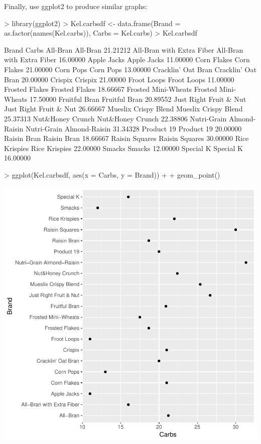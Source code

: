 Finally, use ggplot2 to produce similar graphs:

\begin{Schunk}
\begin{Sinput}
> library(ggplot2)
> Kel.carbsdf <- data.frame(Brand = as.factor(names(Kel.carbs)), Carbs = Kel.carbs)
> Kel.carbsdf 
\end{Sinput}
\begin{Soutput}
                                              Brand    Carbs
All-Bran                                   All-Bran 21.21212
All-Bran with Extra Fiber All-Bran with Extra Fiber 16.00000
Apple Jacks                             Apple Jacks 11.00000
Corn Flakes                             Corn Flakes 21.00000
Corn Pops                                 Corn Pops 13.00000
Cracklin' Oat Bran               Cracklin' Oat Bran 20.00000
Crispix                                     Crispix 21.00000
Froot Loops                             Froot Loops 11.00000
Frosted Flakes                       Frosted Flakes 18.66667
Frosted Mini-Wheats             Frosted Mini-Wheats 17.50000
Fruitful Bran                         Fruitful Bran 20.89552
Just Right Fruit & Nut       Just Right Fruit & Nut 26.66667
Mueslix Crispy Blend           Mueslix Crispy Blend 25.37313
Nut&Honey Crunch                   Nut&Honey Crunch 22.38806
Nutri-Grain Almond-Raisin Nutri-Grain Almond-Raisin 31.34328
Product 19                               Product 19 20.00000
Raisin Bran                             Raisin Bran 18.66667
Raisin Squares                       Raisin Squares 30.00000
Rice Krispies                         Rice Krispies 22.00000
Smacks                                       Smacks 12.00000
Special K                                 Special K 16.00000
\end{Soutput}
\begin{Sinput}
> ggplot(Kel.carbsdf, aes(x = Carbs, y = Brand)) +
+   geom_point()
\end{Sinput}
\end{Schunk}
\includegraphics{lect_chapter5_v2-022}



